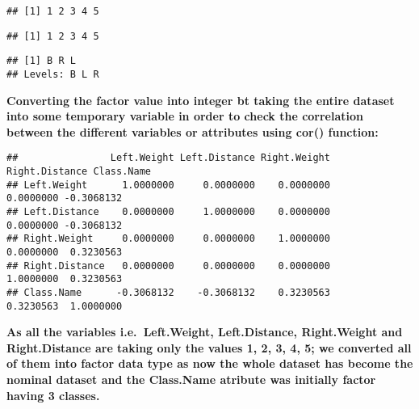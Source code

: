 \documentclass[
]{article}
\newenvironment{Shaded}{\begin{snugshade}}{\end{snugshade}}
\newcommand{\KeywordTok}[1]{\textcolor[rgb]{0.13,0.29,0.53}{\textbf{#1}}}
\newcommand{\NormalTok}[1]{#1}
\newcommand{\OperatorTok}[1]{\textcolor[rgb]{0.81,0.36,0.00}{\textbf{#1}}}
\newcommand{\StringTok}[1]{\textcolor[rgb]{0.31,0.60,0.02}{#1}}
\begin{document}
\begin{verbatim}
## [1] 1 2 3 4 5
\end{verbatim}

\begin{Shaded}
\end{Shaded}

\begin{verbatim}
## [1] 1 2 3 4 5
\end{verbatim}

\begin{Shaded}
\end{Shaded}

\begin{verbatim}
## [1] B R L
## Levels: B L R
\end{verbatim}

\textbf{Converting the factor value into integer bt taking the entire
dataset into some temporary variable in order to check the correlation
between the different variables or attributes using cor() function:}

\begin{Shaded}
\end{Shaded}

\begin{verbatim}
##                Left.Weight Left.Distance Right.Weight Right.Distance Class.Name
## Left.Weight      1.0000000     0.0000000    0.0000000      0.0000000 -0.3068132
## Left.Distance    0.0000000     1.0000000    0.0000000      0.0000000 -0.3068132
## Right.Weight     0.0000000     0.0000000    1.0000000      0.0000000  0.3230563
## Right.Distance   0.0000000     0.0000000    0.0000000      1.0000000  0.3230563
## Class.Name      -0.3068132    -0.3068132    0.3230563      0.3230563  1.0000000
\end{verbatim}

\textbf{As all the variables i.e.~Left.Weight, Left.Distance,
Right.Weight and Right.Distance are taking only the values 1, 2, 3, 4,
5; we converted all of them into factor data type as now the whole
dataset has become the nominal dataset and the Class.Name atribute was
initially factor having 3 classes.}
\end{document}

